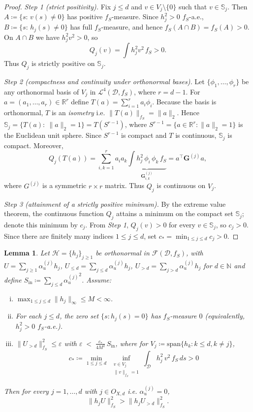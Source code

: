 \documentclass[
  12pt]{article}
\newcommand{\calD}{\mathcal{D}}
\newcommand{\calF}{\mathcal{F}}
\newcommand{\calL}{\mathcal{L}}
\newcommand{\calH}{\mathcal{H}}
\newtheorem{lemma}{Lemma}
\begin{document}
\begin{proof}
\emph{Step 1 (strict positivity).} Fix $j\le d$ and $v\in V_j\setminus\{0\}$ such that $v \in \mathbb S_j$. Then $A\coloneqq\{s:\,v(s)\neq 0\}$ has positive $f_S$-measure. Since $h_j^2>0$ $f_S$-a.e., $B\coloneqq\{s:\,h_j(s)\neq 0\}$ has full $f_S$-measure,
and hence $f_S(A\cap B)=f_S(A)>0$.
On $A\cap B$ we have $h_j^2v^2>0$, so
$$
Q_j(v)=\int h_j^2v^2\,f_S>0.
$$
Thus $Q_j$ is strictly positive on $\mathbb S_j$.

\emph{Step 2 (compactness and continuity under orthonormal bases).} Let $\{\phi_1,\ldots,\phi_r\}$ be any orthonormal basis of $V_j$ in $\calL^4(\calD,f_S)$, where $r=d-1$. For $a=(a_1,\ldots,a_r)\in\mathbb R^r$ define $T(a)=\sum_{i=1}^r a_i\phi_i$. Because the basis is orthonormal, $T$ is an \emph{isometry} i.e. $\|T(a)\|_{f_S} = \|a\|_2$. Hence $\mathbb S_j = \{T(a):\ \|a\|_2=1\} = T(S^{r-1})$, where $S^{r-1}=\{a\in\mathbb R^r:\|a\|_2=1\}$ is the Euclidean unit sphere. Since $S^{r-1}$ is compact and $T$ is continuous, $\mathbb S_j$ is compact. Moreover,
$$
Q_j(T(a)) = \sum_{i,k=1}^r a_i a_k
\underbrace{\int h_j^2\,\phi_i\,\phi_k\,f_S}_{\boldsymbol{G}^{(j)}_{i,k}}
= a^\top \boldsymbol{G}^{(j)} a,
$$
where $G^{(j)}$ is a symmetric $r\times r$ matrix.
Thus $Q_j$ is continuous on $V_j$.

\emph{Step 3 (attainment of a strictly positive minimum).}
By the extreme value theorem, the continuous function $Q_j$ attains a minimum
on the compact set $\mathbb S_j$; denote this minimum by $c_j$.
From \textit{Step 1}, $Q_j(v)>0$ for every $v\in\mathbb S_j$, so $c_j>0$.
Since there are finitely many indices $1 \leq j \leq d$, set $c_\ast=\min_{1\leq j\leq d} c_j>0$.
\end{proof}
\begin{lemma}\label{lem:truncated-variance}
Let $\calH = \{h_j\}_{j\geq 1}$ be orthonormal in $\calF(\calD,f_S)$, with
$U=\sum_{j\geq 1}\alpha_u^{(j)} h_j$, $U_{\leq d}=\sum_{j\leq d}\alpha_u^{(j)} h_j$,
$U_{>d}=\sum_{j>d}\alpha_u^{(j)} h_j$ for $d\in\mathbb N$ and define
$S_{\mathrm{in}}\coloneqq \sum_{j\leq d}{\alpha_u^{(j)}}^2$.
Assume:
\begin{enumerate}[(i)]
\item\label{asm:infty-bound-basis} $\max_{1\le j\le d}\|h_j\|_{\infty}\leq M<\infty$.
\item\label{asm:postive-square-basis} For each $j\leq d$, the zero set $\{s: h_j(s)=0\}$ has $f_S$-measure $0$
(equivalently, $h_j^2>0$ $f_S$-a.e.).
\item\label{asm:c-star} $\|U_{>d}\|_{f_S}^2\le \varepsilon$ with
$\displaystyle \varepsilon \;<\; \frac{c_\ast}{4M^2}\,S_{\mathrm{in}}$, where for $V_j\coloneqq\mathrm{span}\{h_k: k \leq d,k\neq j\}$,
$$
c_\ast \coloneqq \min_{1\le j\le d}\ \inf_{\substack{v\in V_j\\ \|v\|_{f_S}=1}}
\int_\calD h_j^2\,v^2\,f_S\,ds > 0
$$
\end{enumerate}
Then for every $j=1,\dots,d$ with $j \in O_{X,d}$ i.e. $\alpha_u^{(j)}=0$,
$$
\|h_j U\|^2_{f_S} > \|h_j U_{>d}\|^2_{f_S}.
$$
\end{lemma}
\end{document}
